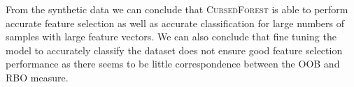 \documentclass[10pt,letterpaper]{article}
\newcommand{\cursedforest}{\textsc{CursedForest}\xspace}
\newcommand{\mtry}{\texttt{mtry}\xspace}
\newcommand{\ntree}{\texttt{ntree}\xspace}
\begin{document}

From the synthetic data we can conclude that \cursedforest is able to perform accurate feature selection as well as
accurate classification for large numbers of samples with large feature vectors.  We can also conclude that fine tuning
the model to accurately classify the dataset does not ensure good feature selection performance as there seems to be
little correspondence between the OOB and RBO measure.
\end{document}
